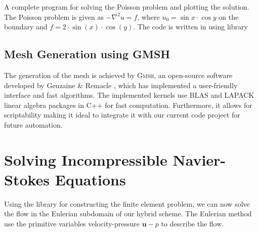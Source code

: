 	\begin{listing}[p]
	\inputminted[fontseries=courier,obeytabs,fontsize=\footnotesize,mathescape,linenos,numbersep=5pt,frame=lines,framesep=2mm,xleftmargin=20mm,xrightmargin=20mm]{python}{figures/eulerian/dolfinExample.py}
	\caption{A complete program for solving the Poisson problem and plotting the solution. The Poisson problem is given as $-\nabla^2{u} = f$, where $u_0 = \sin{x}\cdot\cos{y}$ on the boundary and $f=2\cdot\sin(x)\cdot\cos(y)$. The code is written in \python using  library}
	\label{lst:pycode-poisson}
	\end{listing}

\subsection{Mesh Generation using GMSH}
\label{subsec:mgugmsh}

The generation of the mesh is achieved by \textsc{Gmsh}, an open-source software developed by Geuzaine \& Remacle \cite{Geuzaine2009b}, which has implemented a user-friendly interface and fast algorithms. The \gmsh implemented kernels use \textsc{BLAS} and LAPACK linear algebra packages in C++ for fast computation. Furthermore, it allows for scriptability making it ideal to integrate it with our current \python code project for future automation.

\section{Solving Incompressible Navier-Stokes Equations}
\label{sec:e-sinse}

Using the \dolfin library for constructing the finite element problem, we can now solve the flow in the Eulerian subdomain of our hybrid scheme. The Eulerian method use the primitive variables velocity-pressure $\mathbf{u}-p$ to describe the flow.

